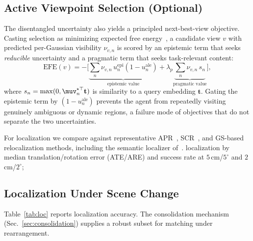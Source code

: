 \subsection{Active Viewpoint Selection (Optional)}
\label{sec:efe}
The disentangled uncertainty also yields a principled next-best-view objective.
Casting selection as minimizing expected free energy~\cite{friston2010}, a
candidate view $v$ with predicted per-Gaussian visibility $\nu_{v,n}$ is scored
by an epistemic term that seeks \emph{reducible} uncertainty and a pragmatic term
that seeks task-relevant content:
\begin{equation}
\mathrm{EFE}(v) = -\Big[\underbrace{\sum_n \nu_{v,n}\,u^{\mathrm{epi}}_n
(1-u^{\mathrm{ale}}_n)}_{\text{epistemic value}}
+ \lambda_p \underbrace{\sum_n \nu_{v,n}\,s_n}_{\text{pragmatic value}}\Big],
\end{equation}
where $s_n=\max(0,\muv^{\star\top}_n \mathbf{t})$ is similarity to a query
embedding $\mathbf{t}$. Gating the epistemic term by $(1-u^{\mathrm{ale}}_n)$
prevents the agent from repeatedly visiting genuinely ambiguous or dynamic
regions, a failure mode of objectives that do not separate the two uncertainties.

For localization we compare against
representative APR~\cite{chen2024marepo}, SCR~\cite{brachmann2023ace}, and
GS-based relocalization methods, including the semantic localizer
of~\cite{chu2026semantic}. 
localization by median translation/rotation error
(ATE/ARE) and success rate at $5\,$cm/$5^\circ$ and $2\,$cm/$2^\circ$;

\subsection{Localization Under Scene Change}
Table~\ref{tab:loc} reports localization accuracy. The consolidation mechanism
(Sec.~\ref{sec:consolidation}) supplies a robust subset for matching under
rearrangement. 

